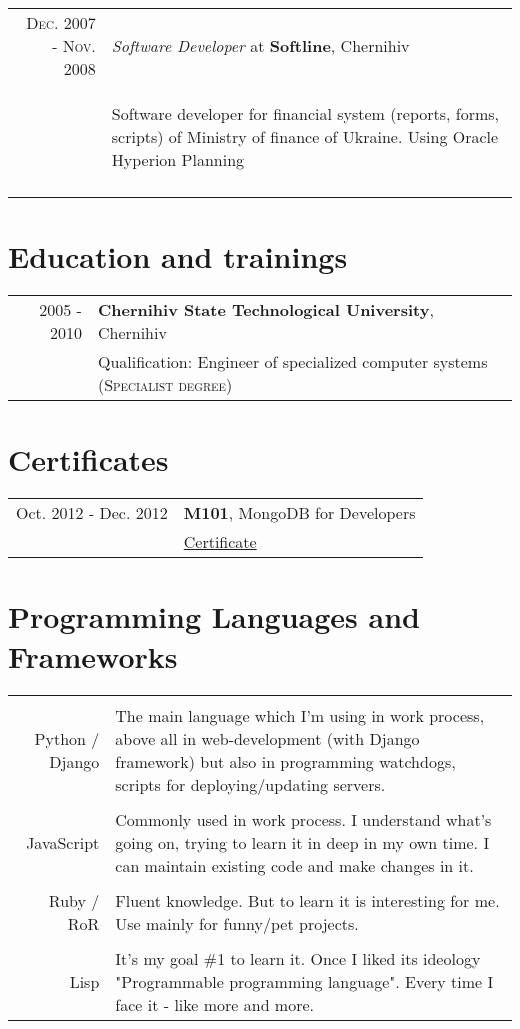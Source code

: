\documentclass[a4paper,10pt]{article}
\begin{document}
\begin{tabular}{rp{11cm}}
  \textsc{Dec. 2007 - Nov. 2008} & \emph{Software Developer} at \textbf{Softline}, Chernihiv\\ 
  & \begin{compactitem} 
    \item Software developer for financial system (reports, forms, scripts) of Ministry of finance of Ukraine. Using Oracle Hyperion Planning
    \end{compactitem}\vspace{-1em} \\
\multicolumn{2}{c}{} \\

\end{tabular}

\section{Education and trainings}
\begin{tabular}{rl}
2005 - 2010 & \textbf{Chernihiv State Technological University}, Chernihiv\\
 & Qualification: Engineer of specialized computer systems (\textsc{Specialist degree})
\end{tabular}

\section{Certificates}
\begin{tabular}{rl}
Oct. 2012 - Dec. 2012 & \textbf{M101}, MongoDB for Developers\\
 & \href{https://s3.amazonaws.com/edu-cert.10gen.com/downloads/8381fb4e8cff46cc82353a3ecea5a070/Certificate.pdf}{Certificate} \\
\end{tabular}

\section{Programming Languages and Frameworks}
\begin{tabular}{r|p{11cm}}
\multicolumn{2}{c}{} \\
Python / Django & The main language which I'm using in work process, above all in web-development (with Django framework) but also in programming watchdogs, scripts for deploying/updating servers.\\
\multicolumn{2}{c}{} \\
JavaScript & Commonly used in work process. I understand what's going on, trying to learn it in deep in my own time. I can maintain existing code and make changes in it.   \\
\multicolumn{2}{c}{} \\
Ruby / RoR & Fluent knowledge. But to learn it is interesting for me. Use mainly for funny/pet projects. \\
\multicolumn{2}{c}{} \\
Lisp & It's my goal \#1 to learn it. Once I liked its ideology "Programmable programming language". Every time I face it - like more and more. \\
\end{tabular}
\end{document}
